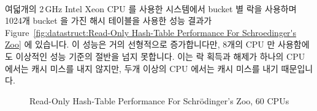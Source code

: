 여덟개의 2\,GHz
Intel\textsuperscript\textregistered
Xeon\textsuperscript\textregistered
CPU 를 사용한 시스템에서 bucket 별 락을 사용하며 1024개 bucket 을 가진 해시
테이블을 사용한 성능 결과가
Figure~\ref{fig:datastruct:Read-Only Hash-Table Performance For Schroedinger's Zoo}
에 있습니다.
이 성능은 거의 선형적으로 증가합니다만, 8개의 CPU 만 사용함에도 이상적인 성능
기준의 절반을 넘지 못합니다.
이는 락 획득과 해제가 하나의 CPU 에서는 캐시 미스를 내지 않지만, 두개 이상의
CPU 에서는 캐시 미스를 내기 때문입니다.

\begin{figure}[tb]
\centering
{}
\caption{Read-Only Hash-Table Performance For Schr\"odinger's Zoo, 60 CPUs}
\label{fig:datastruct:Read-Only Hash-Table Performance For Schroedinger's Zoo, 60 CPUs}
\end{figure}

